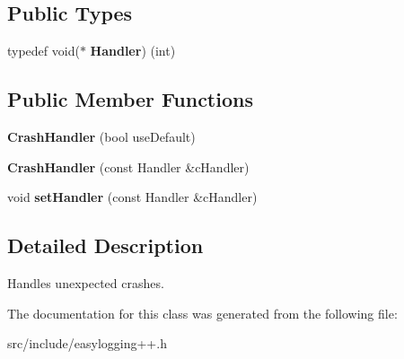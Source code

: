 \subsection*{Public Types}
\begin{DoxyCompactItemize}
\item 
\mbox{\label{classel_1_1base_1_1debug_1_1_crash_handler_aebf80d2fd5180d9c56db5a7e9abc7ad9}} 
typedef void($\ast$ {\bfseries Handler}) (int)
\end{DoxyCompactItemize}
\subsection*{Public Member Functions}
\begin{DoxyCompactItemize}
\item 
\mbox{\label{classel_1_1base_1_1debug_1_1_crash_handler_a1d1e1a77bb6c37b1fbb39ecf94b38983}} 
{\bfseries Crash\+Handler} (bool use\+Default)
\item 
\mbox{\label{classel_1_1base_1_1debug_1_1_crash_handler_a9fbf8df7a292fcbeabfb87b241c83f78}} 
{\bfseries Crash\+Handler} (const Handler \&c\+Handler)
\item 
\mbox{\label{classel_1_1base_1_1debug_1_1_crash_handler_abd1d3d1ad5f1de2d40c39dd0542c26d4}} 
void {\bfseries set\+Handler} (const Handler \&c\+Handler)
\end{DoxyCompactItemize}


\subsection{Detailed Description}
Handles unexpected crashes. 

The documentation for this class was generated from the following file\+:\begin{DoxyCompactItemize}
\item 
src/include/easylogging++.\+h\end{DoxyCompactItemize}

